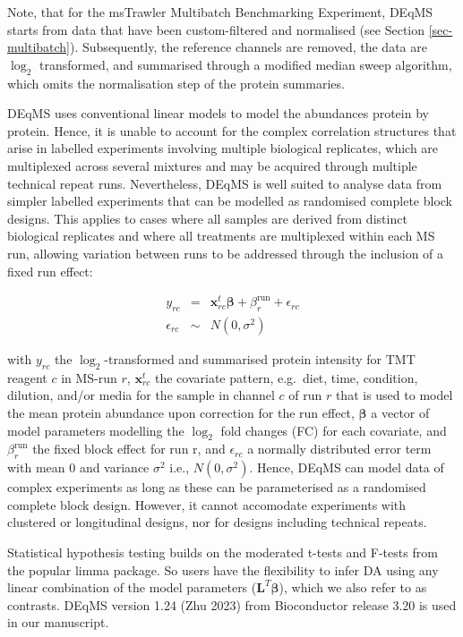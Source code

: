 \documentclass[
  letterpaper,
  DIV=11,
  numbers=noendperiod]{scrartcl}
\begin{document}
Note, that for the msTrawler Multibatch Benchmarking Experiment, DEqMS
starts from data that have been custom-filtered and normalised (see
Section \ref{sec-multibatch}). Subsequently, the reference channels are
removed, the data are \(\log_2\) transformed, and summarised through a
modified median sweep algorithm, which omits the normalisation step of
the protein summaries.

DEqMS uses conventional linear models to model the abundances protein by
protein. Hence, it is unable to account for the complex correlation
structures that arise in labelled experiments involving multiple
biological replicates, which are multiplexed across several mixtures and
may be acquired through multiple technical repeat runs. Nevertheless,
DEqMS is well suited to analyse data from simpler labelled experiments
that can be modelled as randomised complete block designs. This applies
to cases where all samples are derived from distinct biological
replicates and where all treatments are multiplexed within each MS run,
allowing variation between runs to be addressed through the inclusion of
a fixed run effect:

\[
\begin{array}{lcl}
y_{rc} &=& \mathbf{x}_{rc}^t \boldsymbol{\beta} + \beta_r^\text{run}  + \epsilon_{rc}\\
\epsilon_{rc}  &\sim& N(0,\sigma^2)
\end{array}
\]

with \(y_{rc}\) the \(\log_2\)-transformed and summarised protein
intensity for TMT reagent \(c\) in MS-run \(r\), \(\mathbf{x}_{rc}^t\)
the covariate pattern, e.g.~diet, time, condition, dilution, and/or
media for the sample in channel \(c\) of run \(r\) that is used to model
the mean protein abundance upon correction for the run effect,
\(\boldsymbol{\beta}\) a vector of model parameters modelling the
\(\log_2\) fold changes (FC) for each covariate, and
\(\beta_r^\text{run}\) the fixed block effect for run r, and
\(\epsilon_{rc}\) a normally distributed error term with mean 0 and
variance \(\sigma^2\) i.e., \(N(0,\sigma^2)\). Hence, DEqMS can model
data of complex experiments as long as these can be parameterised as a
randomised complete block design. However, it cannot accomodate
experiments with clustered or longitudinal designs, nor for designs
including technical repeats.

Statistical hypothesis testing builds on the moderated t-tests and
F-tests from the popular limma package. So users have the flexibility to
infer DA using any linear combination of the model parameters
(\(\mathbf{L}^T\boldsymbol{\beta}\)), which we also refer to as
contrasts. DEqMS version 1.24 (Zhu 2023) from Bioconductor release 3.20
is used in our manuscript.
\end{document}
